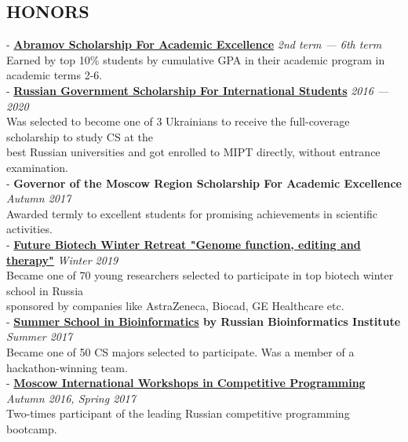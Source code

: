 \documentclass[11pt]{res}
\newcommand{\vmarginsmall}{\vspace{0.1cm}}
\begin{document}
\begin{resume}
\section{HONORS}
\vmarginsmall
- \textbf{\href{http://phystech-foundation.org/en/foundation_}{Abramov Scholarship For Academic Excellence}} \hfill{} \textit{2nd term — 6th term}\\
\hphantom{-} Earned by top 10\% students by cumulative GPA in their academic program in academic terms 2-6.\vspace{0.2em}\\
- \textbf{\href{https://studyinrussia.ru/en/study-in-russia/scholarships}{Russian Government Scholarship For International Students}} \hfill{} \textit{2016 — 2020}\\
\hphantom{-} Was selected to become one of 3 Ukrainians to receive the full-coverage scholarship to study CS at the \\\hphantom{-} best Russian universities and got enrolled to MIPT directly, without entrance examination.\vmarginsmall\\
- \textbf{Governor of the Moscow Region Scholarship For Academic Excellence} \hfill \textit{Autumn 2017}\\
\hphantom{-} Awarded termly to excellent students for promising achievements in scientific activities.\vmarginsmall\\
- \textbf{\href{http://winter2019.futurebiotech.ru/}{Future Biotech Winter Retreat "Genome function, editing and therapy"}} \hfill{} \textit{Winter 2019}\\
\hphantom{-}  Became one of 70 young researchers selected to participate in top biotech winter school in Russia\\ 
\hphantom{-}  sponsored by companies like AstraZeneca, Biocad, GE Healthcare etc. \vmarginsmall\\
\newpage 
$  $\\
- \textbf{\href{https://bioinf.me/en/education}{Summer School in Bioinformatics} by Russian Bioinformatics Institute} \hfill{} \textit{Summer 2017}\\
\hphantom{-} Became one of 50 CS majors selected to participate. Was a member of a hackathon-winning team.\vmarginsmall\\
- \textbf{\href{https://it-edu.mipt.ru/pages/workshops/?lang=en}{Moscow International Workshops in Competitive Programming}} \hfill{} \textit{Autumn 2016, Spring 2017}\\
\hphantom{-}  	Two-times participant of the leading Russian competitive programming bootcamp.\vmarginsmall\\

\end{resume}
\end{document}
